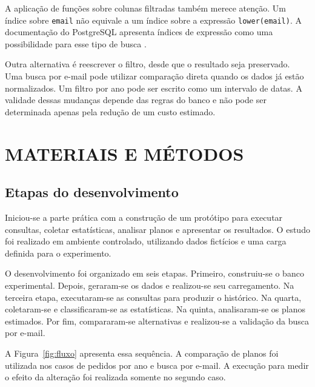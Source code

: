 \documentclass{UNESC}
\newcommand{\codigo}[1]{\texttt{#1}}
\begin{document}
A aplicação de funções sobre colunas filtradas também merece atenção. Um índice sobre \codigo{email} não equivale a um índice sobre a expressão \codigo{lower(email)}. A documentação do PostgreSQL apresenta índices de expressão como uma possibilidade para esse tipo de busca \cite{postgresql2025expression}.

Outra alternativa é reescrever o filtro, desde que o resultado seja preservado. Uma busca por e-mail pode utilizar comparação direta quando os dados já estão normalizados. Um filtro por ano pode ser escrito como um intervalo de datas. A validade dessas mudanças depende das regras do banco e não pode ser determinada apenas pela redução de um custo estimado.


\section{MATERIAIS E MÉTODOS}

\subsection{Etapas do desenvolvimento}

Iniciou-se a parte prática com a construção de um protótipo para executar consultas, coletar estatísticas, analisar planos e apresentar os resultados. O estudo foi realizado em ambiente controlado, utilizando dados fictícios e uma carga definida para o experimento.

O desenvolvimento foi organizado em seis etapas. Primeiro, construiu-se o banco experimental. Depois, geraram-se os dados e realizou-se seu carregamento. Na terceira etapa, executaram-se as consultas para produzir o histórico. Na quarta, coletaram-se e classificaram-se as estatísticas. Na quinta, analisaram-se os planos estimados. Por fim, compararam-se alternativas e realizou-se a validação da busca por e-mail.

A Figura~\ref{fig:fluxo} apresenta essa sequência. A comparação de planos foi utilizada nos casos de pedidos por ano e busca por e-mail. A execução para medir o efeito da alteração foi realizada somente no segundo caso.
\end{document}

